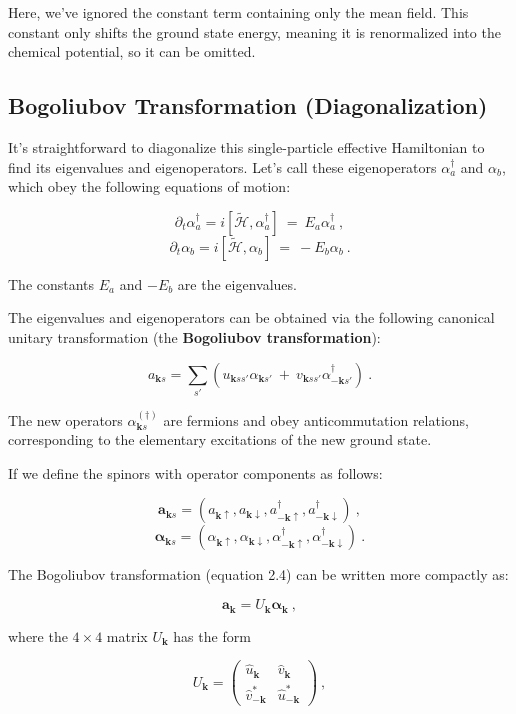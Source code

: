 \documentclass[uplatex,a4j,12pt,dvipdfmx]{jsarticle}
\begin{document}
Here, we've ignored the constant term containing only the mean field.
This constant only shifts the ground state energy, meaning it is renormalized into the chemical potential, so it can be omitted.
\subsection{Bogoliubov Transformation (Diagonalization)}
It's straightforward to diagonalize this single-particle effective Hamiltonian to find its eigenvalues and eigenoperators.
Let's call these eigenoperators $\alpha_{a}^{\dagger}$ and $\alpha_{b}$, which obey the following equations of motion:

\[
	\partial_{t} \alpha_{a}^{\dagger}
	=
	i [ \tilde{\mathcal{H}} , \alpha_{a}^{\dagger} ]
	\ = \
	E_{a} \alpha_{a}^{\dagger}
	\ ,
\]\[
	\partial_{t} \alpha_{b}
	=
	i [ \tilde{\mathcal{H}} , \alpha_{b} ]
	\ = \
	- E_{b} \alpha_{b}
	\ .
	\nonumber
\]

The constants $E_{a}$ and $-E_{b}$ are the eigenvalues.

The eigenvalues and eigenoperators can be obtained via the following canonical unitary transformation (the \textbf{Bogoliubov transformation}):

\[
	a_{\bm{k} s}
	=
	\sum_{s'}
	(
	u_{\bm{k} s s'}
	\alpha_{\bm{k} s'}
	\ + \
	v_{\bm{k} s s'}
	\alpha_{ - \bm{k} s'}^{\dagger}
	)
	\ .
\]


The new operators $\alpha_{\bm{k}s}^{(\dagger)}$ are fermions and obey anticommutation relations, corresponding to the elementary excitations of the new ground state.

If we define the spinors with operator components as follows:

\[
	\bm{a}_{\bm{k} s}
	=
	(
	a_{\bm{k} \uparrow}
	,
	a_{\bm{k} \downarrow}
	,
	a_{- \bm{k} \uparrow}^{\dagger}
	,
	a_{- \bm{k} \downarrow}^{\dagger}
	)
	\ , \]\[
	\bm{\alpha}_{\bm{k} s}
	=
	(
	\alpha_{\bm{k} \uparrow}
	,
	\alpha_{\bm{k} \downarrow}
	,
	\alpha_{- \bm{k} \uparrow}^{\dagger}
	,
	\alpha_{- \bm{k} \downarrow}^{\dagger}
	)
	\ .
	\nonumber
\]

The Bogoliubov transformation (equation 2.4) can be written more compactly as:

\[
	\bm{a}_{\bm{k}}
	=
	U_{\bm{k}}
	\bm{\alpha}_{\bm{k}}
	\ ,
	\nonumber
\]

where the $4 \times 4$ matrix $U_{\bm{k}}$ has the form

\[
	U_{\bm{k}}
	=
	\left(
	\begin{array}{cc}
			\hat{u}_{\bm{k}}      & \hat{v}_{\bm{k}}      \\
			\hat{v}_{-\bm{k}}^{*} & \hat{u}_{-\bm{k}}^{*}
		\end{array}
	\right)
	\ ,
\]
\end{document}
